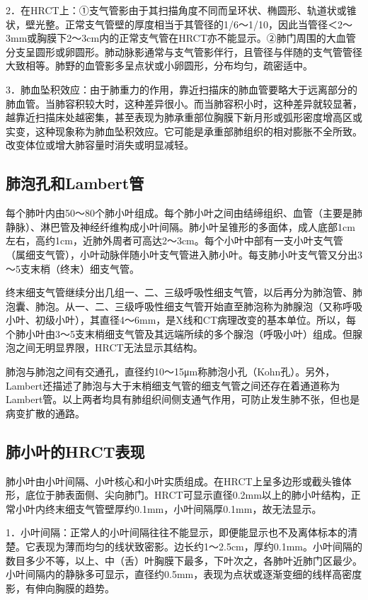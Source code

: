 2．在HRCT上：①支气管影由于其扫描角度不同而呈环状、椭圆形、轨道状或锥状，壁光整。正常支气管壁的厚度相当于其管径的1/6～1/10，因此当管径＜2～3mm或胸膜下2～3cm内的正常支气管在HRCT亦不能显示。②肺门周围的大血管分支呈圆形或卵圆形。肺动脉影通常与支气管影伴行，且管径与伴随的支气管管径大致相等。肺野的血管影多呈点状或小卵圆形，分布均匀，疏密适中。

3．肺血坠积效应：由于肺重力的作用，靠近扫描床的肺血管要略大于远离部分的肺血管。当肺容积较大时，这种差异很小。而当肺容积小时，这种差异就较显著，越靠近扫描床处越密集，甚至表现为肺承重部位胸膜下新月形或弧形密度增高区或实变，这种现象称为肺血坠积效应。它可能是承重部肺组织的相对膨胀不全所致。改变体位或增大肺容量时消失或明显减轻。

\subsection{肺泡孔和Lambert管}

每个肺叶内由50～80个肺小叶组成。每个肺小叶之间由结缔组织、血管（主要是肺静脉）、淋巴管及神经纤维构成小叶间隔。肺小叶呈锥形的多面体，成人底部1cm左右，高约1cm，近肺外周者可高达2～3cm。每个小叶中部有一支小叶支气管（属细支气管），小叶动脉伴随小叶支气管进入肺小叶。每支肺小叶支气管又分出3～5支末梢（终末）细支气管。

终末细支气管继续分出几组一、二、三级呼吸性细支气管，以后再分为肺泡管、肺泡囊、肺泡。从一、二、三级呼吸性细支气管开始直至肺泡称为肺腺泡（又称呼吸小叶、初级小叶），其直径4～6mm，是X线和CT病理改变的基本单位。所以，每个肺小叶由3～5支末梢细支气管及其远端所续的多个腺泡（呼吸小叶）组成。但腺泡之间无明显界限，HRCT无法显示其结构。

肺泡与肺泡之间有交通孔，直径约10～15μm称肺泡小孔（Kohn孔）。另外，Lambert还描述了肺泡与大于末梢细支气管的细支气管之间还存在着通道称为
Lambert管。以上两者均具有肺组织间侧支通气作用，可防止发生肺不张，但也是病变扩散的通路。

\subsection{肺小叶的HRCT表现}

肺小叶由小叶间隔、小叶核心和小叶实质组成。在HRCT上呈多边形或截头锥体形，底位于肺表面侧、尖向肺门。HRCT可显示直径0.2mm以上的肺小叶结构，正常小叶内终末细支气管壁厚约0.1mm，小叶间隔厚0.1mm，故无法显示。

1．小叶间隔：正常人的小叶间隔往往不能显示，即便能显示也不及离体标本的清楚。它表现为薄而均匀的线状致密影。边长约1～2.5cm，厚约0.1mm。小叶间隔的数目多少不等，以上、中（舌）叶胸膜下最多，下叶次之，各肺叶近肺门区最少。小叶间隔内的静脉多可显示，直径约0.5mm，表现为点状或逐渐变细的线样高密度影，有伸向胸膜的趋势。


